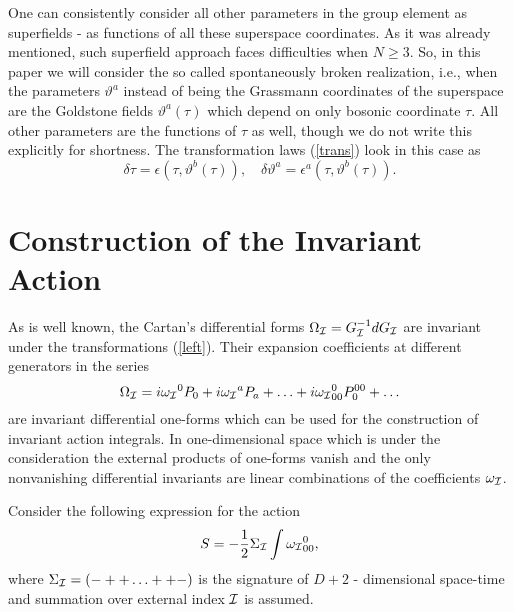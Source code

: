 \documentclass[a4paper,twocolumn,showpacs,preprintnumbers,amsmath,amssymb]{revtex4}
\newcommand{\p}[1]{(\ref{#1})}
\begin{document}
One can consistently consider all other parameters in the group element
as superfields -
 as functions of all
these superspace coordinates. As it was already mentioned, such superfield
approach
faces  difficulties when $N\geq 3$.  So, in this paper
we will consider the so called spontaneously broken
realization, i.e., when the parameters $\vartheta^a$ instead of being
the Grassmann coordinates
of the superspace are the Goldstone fields
$\vartheta^a(\tau)$ which depend on  only bosonic coordinate
$\tau$. All other parameters are the functions of $\tau$ as well,
though we do not write this explicitly for shortness. The transformation laws
\p{trans} look in this case as
\begin{equation}\label{trans1}
\delta \tau = \epsilon(\tau,\vartheta^b(\tau)),\quad
\delta \vartheta^a = \epsilon^a(\tau,\vartheta^b(\tau)).
\end{equation}
\section{Construction of the Invariant Action}
As is well known, the Cartan's differential forms $\Omega_{\cal I}=
G_{\cal I}^{-1} d G_{\cal I}$ are invariant under the transformations
(\ref{left}). Their expansion coefficients at different generators
in the series
\begin{equation}\label{Omega}
\Omega_{\cal I}=i{\omega_{\cal I}}^0 P_0+i{\omega_{\cal I}}^a P_a+\ldots+
i{\omega_{\cal I}}^0_{00} P^{00}_0+\ldots
\end{equation}
are invariant differential one-forms which can be used
for the construction of invariant action integrals.
In one-dimensional space which is under the consideration
the external products of one-forms vanish and
the only nonvanishing differential invariants are linear
combinations of the coefficients $\omega_{\cal I}$.

Consider the following expression for the action
\begin{equation}\label{GenAct}
  S=-\frac{1}{2}\Sigma_{\cal I}\int {\omega_{\cal I}}^0_{00},
\end{equation}
where $\Sigma_{\cal I}=(-++\ldots++-)$
is the signature of $D+2$ - dimensional
space-time and summation over external index ${\cal I}$ is assumed.
\end{document}

